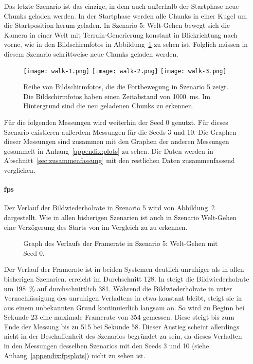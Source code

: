 Das letzte Szenario ist das einzige, in dem auch außerhalb der Startphase neue Chunks geladen werden. In der Startphase werden alle Chunks in einer Kugel um die Startposition herum geladen. In Szenario 5: Welt-Gehen bewegt sich die Kamera in einer Welt mit Terrain-Generierung konstant in Blickrichtung nach vorne, wie in den Bildschirmfotos in Abbildung~\ref{fig:walk} zu sehen ist. Folglich müssen in diesem Szenario schrittweise neue Chunks geladen werden.
\begin{figure}[!htbp]
	\centering
	\texttt{[image: walk-1.png]}
	\texttt{[image: walk-2.png]}
	\texttt{[image: walk-3.png]}
	\caption[Reihe von Bildschirmfotos, die die Fortbewegung in Szenario 5 zeigt.]{Reihe von Bildschirmfotos, die die Fortbewegung in Szenario 5 zeigt. Die Bildschirmfotos haben einen Zeitabstand von \SI{1000}{\milli\second}. Im Hintergrund sind die neu geladenen Chunks zu erkennen.}\label{fig:walk}
\end{figure}

Für die folgenden Messungen wird weiterhin der Seed 0 genutzt. Für dieses Szenario existieren außerdem Messungen für die Seeds 3 und 10. Die Graphen dieser Messungen sind zusammen mit den Graphen der anderen Messungen gesammelt in Anhang~\vref{appendix:plots} zu sehen. Die Daten werden in Abschnitt~\ref{sec:zusammenfassung} mit den restlichen Daten zusammenfassend verglichen.

\paragraph{\ac{fps}}
Der Verlauf der Bildwiederholrate in Szenario 5 wird von Abbildung~\ref{fig:seed-0-walk-fps} dargestellt. Wie in allen bisherigen Szenarien ist auch in Szenario Welt-Gehen eine Verzögerung des Starts von \sysB{} im Vergleich zu \sysA{} zu erkennen.
\begin{figure}[!htbp]
	\caption{Graph des Verlaufs der Framerate in Szenario 5: Welt-Gehen mit Seed 0.}\label{fig:seed-0-walk-fps}
\end{figure}
Der Verlauf der Framerate ist in beiden Systemen deutlich unruhiger als in allen bisherigen Szenarien. \sysA{} erreicht im Durchschnitt \SI{128}{\fps}. In \sysB{} steigt die Bildwiederholrate um \SI{198}{\percent} auf durchschnittlich \SI{381}{\fps}. Während die Bildwiederholrate in \sysA{} unter Vernachlässigung des unruhigen Verhaltens in etwa konstant bleibt, steigt sie in \sysB{} aus einem unbekannten Grund kontinuierlich langsam an. So wird zu Beginn bei Sekunde 23 eine maximale Framerate von \SI{354}{\fps} gemessen. Diese steigt bis zum Ende der Messung bis zu \SI{515}{\fps} bei Sekunde 58. Dieser Anstieg scheint allerdings nicht in der Beschaffenheit des Szenarios begründet zu sein, da dieses Verhalten in den Messungen desselben Szenarios mit den Seeds 3 und 10 (siehe Anhang~\vref{appendix:fpsplots}) nicht zu sehen ist. 

